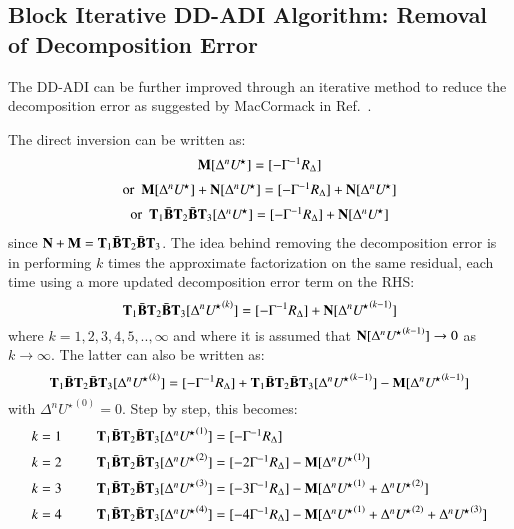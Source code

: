 \documentclass{warpdoc}
\newcommand{\alb}{\vspace{0.2cm}\\} %
\newcommand{\M}{{\bf M}}
\newcommand{\N}{{\bf N}}
\newcommand{\BI}{\wbar{{\bf B}}}
\newcommand{\T}{{\bf T}}
\newcommand{\Ustar}{U^{\!\star}}
\begin{document}
\subsection{Block Iterative DD-ADI Algorithm: Removal of Decomposition Error}

The DD-ADI can be further improved through an iterative method to reduce the decomposition error as suggested by MacCormack in Ref.\ \cite{caf:2001:maccormack}.

The direct inversion can be written as:
%
\begin{displaymath}
  \begin{array}{c}
  \M [ \Delta^n \Ustar ] = [- \Gamma^{-1} R_{\Delta}] \alb
{\rm or~~}  \M [ \Delta^n \Ustar ] + \N [ \Delta^n \Ustar ]= [- \Gamma^{-1} R_{\Delta}] + \N [ \Delta^n \Ustar ]\alb
{\rm or~~}  \T_1 \BI \T_2 \BI \T_3 [ \Delta^n \Ustar ] = [- \Gamma^{-1} R_{\Delta}] + \N [ \Delta^n \Ustar ]
  \end{array}
\end{displaymath}
%
since $\N+\M=\T_1 \BI \T_2 \BI \T_3$.
The idea behind removing the decomposition error is in performing
$k$ times the approximate factorization on the same residual, each
time using a more updated decomposition error term on the RHS:
%
\begin{equation}
  \T_1 \BI \T_2 \BI \T_3 [ \Delta^n {\Ustar}^{(k)} ] = [- \Gamma^{-1} R_{\Delta}] + \N [ \Delta^n {\Ustar}^{(k-1)} ]
\end{equation}
%
where $k=1,2,3,4,5,..,\infty$ and where it is assumed that
$\N [ \Delta^n {\Ustar}^{(k-1)} ] \rightarrow 0$ as $k \rightarrow \infty$.
The latter can also be written as:
%
\begin{equation}
    \T_1 \BI \T_2 \BI \T_3 [ \Delta^n {\Ustar}^{(k)} ]
  = [- \Gamma^{-1} R_{\Delta}] + \T_1 \BI \T_2 \BI \T_3 [ \Delta^n {\Ustar}^{(k-1)} ]
    - \M [ \Delta^n {\Ustar}^{(k-1)} ]
\end{equation}
%
with $\Delta^n {\Ustar}^{(0)}=0$. Step by step, this becomes:
%
%
\begin{displaymath}
 \begin{array}{rcl}
   k=1 & ~~&
    \T_1 \BI \T_2 \BI \T_3 [ \Delta^n {\Ustar}^{(1)} ]
    = [- \Gamma^{-1} R_{\Delta}]  \alb
   k=2 & ~~&
    \T_1 \BI \T_2 \BI \T_3 [ \Delta^n {\Ustar}^{(2)} ]
    = [- 2 \Gamma^{-1} R_{\Delta}] - \M [ \Delta^n {\Ustar}^{(1)} ] \alb
   k=3 & ~~&
    \T_1 \BI \T_2 \BI \T_3 [ \Delta^n {\Ustar}^{(3)} ]
    = [- 3 \Gamma^{-1} R_{\Delta}] - \M [ \Delta^n {\Ustar}^{(1)} + \Delta^n {\Ustar}^{(2)} ]  \alb
   k=4 & ~~&
    \T_1 \BI \T_2 \BI \T_3 [ \Delta^n {\Ustar}^{(4)} ]
    = [- 4 \Gamma^{-1} R_{\Delta}] - \M [ \Delta^n {\Ustar}^{(1)} + \Delta^n {\Ustar}^{(2)} + \Delta^n {\Ustar}^{(3)}]
 \end{array}
\end{displaymath}
%
\end{document}
